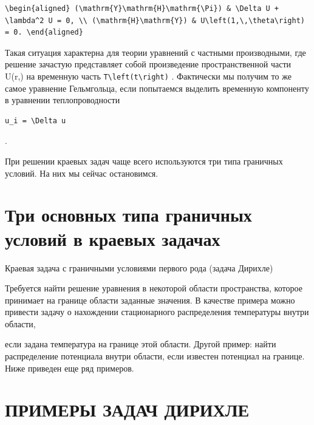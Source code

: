\documentclass[
  ukrainian,
]{article}
\begin{document}
\begin{verbatim}
\begin{aligned} (\mathrm{Y}\mathrm{H}\mathrm{\Pi}) & \Delta U + \lambda^2 U = 0, \\ (\mathrm{H}\mathrm{Y}) & U\left(1,\,\theta\right) = 0. \end{aligned}
\end{verbatim}

Такая ситуация характерна для теории уравнений с частными производными,
где решение зачастую представляет собой произведение пространственной
части U\left(r,\theta\right) на временную часть
\texttt{T\textbackslash{}left(t\textbackslash{}right)} . Фактически мы
получим то же самое уравнение Гельмгольца, если попытаемся выделить
временную компоненту в уравнении теплопроводности

\begin{verbatim}
u_i = \Delta u
\end{verbatim}

.

При решении краевых задач чаще всего используются три типа граничных
условий. На них мы сейчас остановимся.

\section{Три основных типа граничных условий в краевых
задачах}\label{ux442ux440ux438-ux43eux441ux43dux43eux432ux43dux44bux445-ux442ux438ux43fux430-ux433ux440ux430ux43dux438ux447ux43dux44bux445-ux443ux441ux43bux43eux432ux438ux439-ux432-ux43aux440ux430ux435ux432ux44bux445-ux437ux430ux434ux430ux447ux430ux445}

Краевая задача с граничными условиями первого рода (задача Дирихле)

Требуется найти решение уравнения в некоторой области пространства,
которое принимает на границе области заданные значения. В качестве
примера можно привести задачу о нахождении стационарного распределения
температуры внутри области,

если задана температура на границе этой области. Другой пример: найти
распределение потенциала внутри области, если известен потенциал на
границе. Ниже приведен еще ряд примеров.

\section{ПРИМЕРЫ ЗАДАЧ
ДИРИХЛЕ}\label{ux43fux440ux438ux43cux435ux440ux44b-ux437ux430ux434ux430ux447-ux434ux438ux440ux438ux445ux43bux435}
\end{document}

